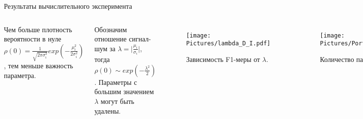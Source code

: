 \documentclass{beamer}
\begin{document}
\begin{frame}{Результаты вычислительного эксперимента}
	
\begin{columns}
	\column{6.2cm}
	
	
	Чем больше плотность вероятности в нуле $\rho(0)=\frac{1}{\sqrt{2\pi\sigma_i^2}}exp(-\frac{\mu_i^2}{2\sigma_i^2})$, тем меньше важность параметра.

	Обозначим отношение сигнал-шум за $\lambda = \big|\frac{\mu_i}{\sigma_i}\big|$, тогда $\rho(0) \sim exp(-\frac{\lambda^2}{2})$.
	Параметры с большим значением $\lambda$ могут быть удалены.
	
	\vspace{0.1cm}
	
	\begin{figure}
	\texttt{[image: Pictures/lambda\_D\_I.pdf]}
	\vspace{-0.45cm}
	\caption*{Зависимость F1-меры от $\lambda$.}
	\end{figure}
	

	
	\column{5.6cm}

	\vspace{-0.55cm}
	\begin{figure}
	\texttt{[image: Pictures/Portion\_of\_pruned\_weights\_on\_lambda\_D\_I.pdf]}
	\vspace{-0.45cm}	
	\caption*{Количество параметров от $\lambda$.}
	\end{figure}
	
	\vspace{-1.2cm}
	
	\begin{figure}
	\texttt{[image: Pictures/pruning\_evidence\_D\_I.pdf]}
	\vspace{-0.45cm}	
	\caption*{Зависимость правдоподобия от $\lambda$.}
	\end{figure}
	
\end{columns}
%
%	
%	
\end{frame}
\end{document}
